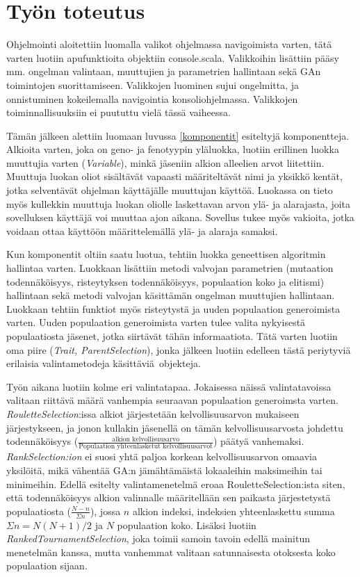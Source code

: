 \section{Työn toteutus}

Ohjelmointi aloitettiin luomalla valikot ohjelmassa navigoimista varten, tätä varten luotiin apufunktioita objektiin console.scala.
Valikkoihin lisättiin pääsy mm. ongelman valintaan, muuttujien ja parametrien hallintaan sekä GAn toimintojen suorittamiseen.
Valikkojen luominen sujui ongelmitta, ja onnistuminen kokeilemalla navigointia konsoliohjelmassa. Valikkojen toiminnallisuuksiin
ei puututtu vielä tässä vaiheessa.

Tämän jälkeen alettiin luomaan luvussa \ref{komponentit} esiteltyjä komponentteja. Alkioita varten, joka on geno- ja fenotyypin yläluokka,
luotiin erillinen luokka muuttujia varten (\textit{Variable}), minkä jäseniin alkion alleelien arvot liitettiin. Muuttuja luokan oliot
sisältävät vapaasti määriteltävät nimi ja yksikkö kentät, jotka selventävät ohjelman käyttäjälle muuttujan käyttöä. Luokassa on tieto myös
kullekkin muuttuja luokan oliolle laskettavan arvon ylä- ja alarajasta, joita sovelluksen käyttäjä voi muuttaa ajon aikana.
Sovellus tukee myös vakioita, jotka voidaan ottaa käyttöön määrittelemällä ylä- ja alaraja samaksi.

Kun komponentit oltiin saatu luotua, tehtiin luokka geneettisen algoritmin hallintaa varten. Luokkaan lisättiin metodi
valvojan parametrien (mutaation todennäköisyys, risteytyksen todennäköisyys, populaation koko ja elitismi) hallintaan
sekä metodi valvojan käsittämän ongelman muuttujien hallintaan. Luokkaan tehtiin funktiot myös risteytystä ja uuden populaation
generoimista varten. Uuden populaation generoimista varten tulee valita nykyisestä populaatiosta jäsenet, jotka siirtävät tähän informaatiota.
Tätä varten luotiin oma piire (\textit{Trait, ParentSelection}), jonka jälkeen luotiin edelleen tästä periytyviä
erilaisia valintametodeja käsittäviä objekteja.

Työn aikana luotiin kolme eri valintatapaa. Jokaisessa näissä valintatavoissa valitaan riittävä määrä vanhempia seuraavan
populaation generoimsta varten. \textit{RouletteSelection}:issa alkiot järjestetään kelvollisuusarvon mukaiseen
järjestykseen, ja jonon kullakin jäsenellä on tämän kelvollisuusarvosta johdettu todennäköisyys
(\(\frac{\text{alkion kelvollisuusarvo}}{\text{Populaation yhteenlasketut kelvollisuusarvot}}\))
päätyä vanhemaksi. \textit{RankSelection:ion} ei suosi yhtä paljoa korkean kelvollisuusarvon omaavia yksilöitä,
mikä vähentää GA:n jämähtämäistä lokaaleihin maksimeihin tai minimeihin. Edellä esitelty valintamenetelmä
eroaa RouletteSelection:ista siten, että todennäköisyys alkion valinnalle määritellään sen paikasta järjestetystä
populaatiosta (\(\frac{N-n}{\Sigma n}\)), jossa \(n\) alkion indeksi, indeksien yhteenlaskettu summa
\(\Sigma n = N(N + 1)/2\) ja \(N\) populaation koko. Lisäksi luotiin \textit{RankedTournamentSelection}, joka toimii
samoin tavoin edellä mainitun menetelmän kanssa, mutta vanhemmat valitaan satunnaisesta otoksesta koko populaation
sijaan.

